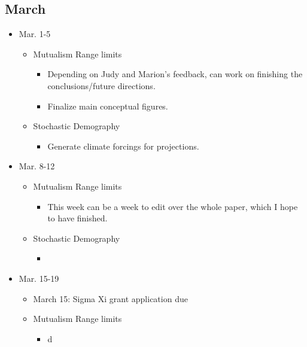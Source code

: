\documentclass{article}
\begin{document}
\subsection*{March}
\begin{itemize}
\item{Mar. 1-5}
   \begin{itemize}
     \item{Mutualism Range limits}
        \begin{itemize}
          \item{Depending on Judy and Marion's feedback, can work on finishing the conclusions/future directions.}
          \item{Finalize main conceptual figures.}
        \end{itemize}
   
     \item{Stochastic Demography}
        \begin{itemize}
           \item{Generate climate forcings for projections.}
        \end{itemize}
    \end{itemize}     

        
\item{Mar. 8-12}
   \begin{itemize}
     \item{Mutualism Range limits}
        \begin{itemize}
            \item{This week can be a week to edit over the whole paper, which I hope to have finished.}
        \end{itemize}
   
     \item{Stochastic Demography}
        \begin{itemize}
           \item{}
        \end{itemize}  
    \end{itemize}     

        
\item{Mar. 15-19}
   \begin{itemize}
     \item{March 15: Sigma Xi grant application due}
     \item{Mutualism Range limits}
        \begin{itemize}
            \item{d}
        \end{itemize}
   

\end{itemize}
\end{itemize}
\end{document}
